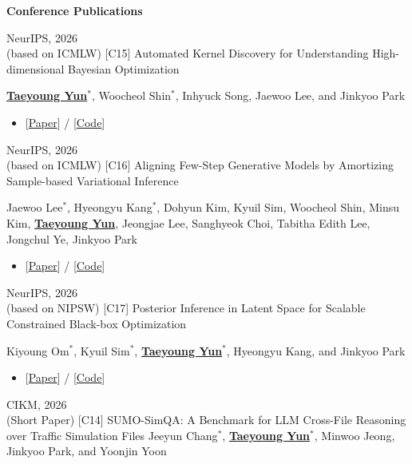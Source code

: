 \documentclass[10pt]{developercv} %
\begin{document}
\textbf{Conference Publications}
\vspace{8pt}
\begin{entrylist}
    \entry
        {NeurIPS, 2026 \\ (based on ICMLW)}
        {[C15] Automated Kernel Discovery for Understanding High-dimensional Bayesian Optimization}
        {}
        {\underline{\textbf{Taeyoung Yun}$^{*}$}, Woocheol Shin$^{*}$, Inhyuck Song, Jaewoo Lee, and Jinkyoo Park
        \begin{itemize}[noitemsep,topsep=2pt,parsep=2pt,partopsep=0pt, leftmargin=0pt]
            \item[]{[\href{https://arxiv.org/abs/2605.20249}{Paper}] / [\href{https://github.com/dbsxodud-11/automatic_kernel_discovery}{Code}]}
        \end{itemize}
        }
    \entry
        {NeurIPS, 2026 \\ (based on ICMLW)}
        {[C16] Aligning Few-Step Generative Models by Amortizing Sample-based Variational Inference}
        {}
        {Jaewoo Lee$^*$, Hyeongyu Kang$^*$, Dohyun Kim, Kyuil Sim, Woocheol Shin, Minsu Kim, \underline{\textbf{Taeyoung Yun}}, Jeongjae Lee, Sanghyeok Choi, Tabitha Edith Lee, Jongchul Ye, Jinkyoo Park
        \begin{itemize}[noitemsep,topsep=2pt,parsep=2pt,partopsep=0pt, leftmargin=0pt]
            \item[]{[\href{https://arxiv.org/abs/2605.26552}{Paper}] / [\href{https://github.com/Jaewoopudding/FAV}{Code}]}
        \end{itemize}
        }
    \entry
        {NeurIPS, 2026  \\ (based on NIPSW)}
        {[C17] Posterior Inference in Latent Space for Scalable Constrained Black-box Optimization}
        {}
        {Kiyoung Om$^*$, Kyuil Sim$^*$, \underline{\textbf{Taeyoung Yun$^{*}$}}, Hyeongyu Kang, and Jinkyoo Park
        \begin{itemize}[noitemsep,topsep=2pt,parsep=2pt,partopsep=0pt, leftmargin=0pt]
            \item[]{[\href{https://arxiv.org/abs/2507.00480}{Paper}] / [\href{https://github.com/umkiyoung/CiBO}{Code}]}
        \end{itemize}
        }
    \entry
        {CIKM, 2026 \\ (Short Paper)}
        {[C14] SUMO-SimQA: A Benchmark for LLM Cross-File Reasoning over Traffic Simulation Files}
        {}
        {Jeeyun	Chang$^{*}$, \underline{\textbf{Taeyoung Yun$^{*}$}}, Minwoo Jeong, Jinkyoo Park, and Yoonjin Yoon
}
\end{entrylist}
\end{document}
